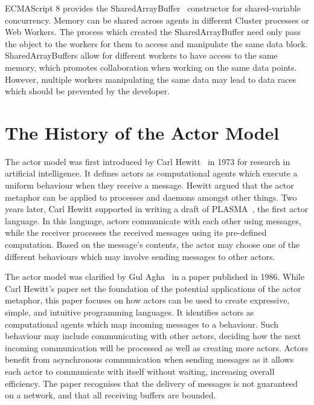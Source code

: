 \documentclass[oneside]{um-fict}
\begin{document}
ECMAScript 8 provides the SharedArrayBuffer~\cite{sharedarraybuffer} constructor for shared-variable concurrency. Memory can be shared across agents in different Cluster processes or Web Workers. The process which created the SharedArrayBuffer need only pass the object to the workers for them to access and manipulate the same data block. SharedArrayBuffers allow for different workers to have access to the same memory, which promotes collaboration when working on the same data points. However, multiple workers manipulating the same data may lead to data races which should be prevented by the developer.

\section{The History of the Actor Model}
The actor model was first introduced by Carl Hewitt~\cite{hewitt1973session, 43years} in 1973 for research in artificial intelligence. It defines actors as computational agents which execute a uniform behaviour when they receive a message. Hewitt argued that the actor metaphor can be applied to processes and daemons amongst other things. Two years later, Carl Hewitt supported in writing a draft of PLASMA~\cite{plasma, chewitthowto}, the first actor language. In this language, actors communicate with each other using messages, while the receiver processes the received messages using its pre-defined computation. Based on the message's contents, the actor may choose one of the different behaviours which may involve sending messages to other actors.

The actor model was clarified by Gul Agha~\cite{agha1985actors} in a paper published in 1986. While Carl Hewitt's paper set the foundation of the potential applications of the actor metaphor, this paper focuses on how actors can be used to create expressive, simple, and intuitive programming languages. It identifies actors as computational agents which map incoming messages to a behaviour. Such behaviour may include communicating with other actors, deciding how the next incoming communication will be processed as well as creating more actors. Actors benefit from asynchronous communication when sending messages as it allows each actor to communicate with itself without waiting, increasing overall efficiency. The paper recognises that the delivery of messages is not guaranteed on a network, and that all receiving buffers are bounded.
\end{document}
